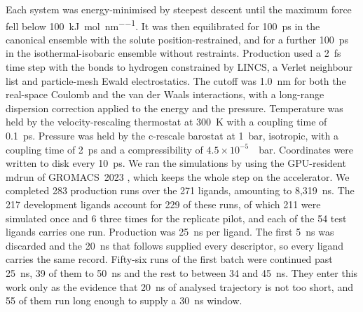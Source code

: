 \begin{table}[tb]
  \centering
  \caption{\textbf{Simulated system composition.} Atom counts, box size, charges and
    force fields, over the 217 development systems. The 54 test systems were built by the same procedure.}
  \label{tab:system}
  
\end{table}

Each system was energy-minimised by steepest descent until the maximum force fell below
\SI{100}{\kilo\joule\per\mole\per\nano\metre}. It was then equilibrated for
\SI{100}{\pico\second} in the canonical ensemble with the solute position-restrained,
and for a further \SI{100}{\pico\second} in the isothermal-isobaric ensemble without
restraints. Production used a \SI{2}{\femto\second} time step with the bonds to
hydrogen constrained by LINCS, a Verlet neighbour list and particle-mesh Ewald
electrostatics. The cutoff was \SI{1.0}{\nano\metre} for both the real-space Coulomb
and the van der Waals interactions, with a long-range dispersion correction applied to
the energy and the pressure. Temperature was held by the velocity-rescaling thermostat
at \SI{300}{\kelvin} with a coupling time of \SI{0.1}{\pico\second}. Pressure was held
by the c-rescale barostat at \SI{1}{\bar}, isotropic, with a coupling time of
\SI{2}{\pico\second} and a compressibility of $4.5\times10^{-5}$~\si{\per\bar}.
Coordinates were written to disk every \SI{10}{\pico\second}. We ran the simulations by
using the GPU-resident mdrun of GROMACS~2023 \citep{gromacs}, which keeps the whole
step on the accelerator. We completed 283 production runs over the 271
ligands, amounting to 8{,}319~ns. The 217 development ligands account for 229 of these
runs, of which 211 were simulated once and 6 three times for the replicate pilot, and
each of the 54 test ligands carries one run. Production was \SI{25}{\nano\second} per ligand. The first
\SI{5}{\nano\second} was discarded and the \SI{20}{\nano\second} that follows supplied
every descriptor, so every ligand carries the same record. Fifty-six runs of the first
batch were continued past \SI{25}{\nano\second}, 39 of them to \SI{50}{\nano\second} and
the rest to between 34 and \SI{45}{\nano\second}. They enter this work only as the
evidence that \SI{20}{\nano\second} of analysed trajectory is not too short, and 55 of
them run long enough to supply a \SI{30}{\nano\second} window.

